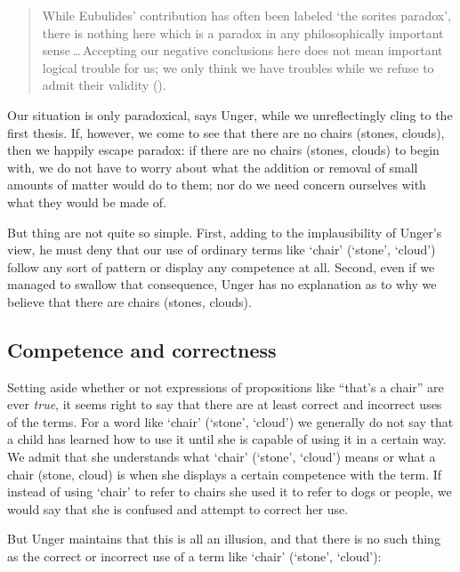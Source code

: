 \documentclass[11pt]{standalone} \newif\ifstandlone \standalonetrue
\newenvironment{squote}{%
	\begin{quote}\begin{singlespace}%
	}{%
	\end{singlespace}\end{quote}}
\begin{document}
\begin{spacing}{1.5}
\begin{enumerate}
\begin{squote}
While Eubulides' contribution has often been labeled `the sorites
paradox', there is nothing here which is a paradox in any
philosophically important sense\,\ldots\,Accepting our negative
conclusions here does not mean important logical trouble for us; we
only think we have troubles while we refuse to admit their validity
(\citeyear[145]{unger1979}).
\end{squote}

Our situation is only paradoxical, says Unger, while we unreflectingly
cling to the first thesis.  If, however, we come to see that there are
no chairs (stones, clouds), then we happily escape paradox: if there
are no chairs (stones, clouds) to begin with, we do not have to worry
about what the addition or removal of small amounts of matter would do
to them; nor do we need concern ourselves with what they would be made
of.

But thing are not quite so simple.  First, adding to the
implausibility of Unger's view, he must deny that our use of ordinary
terms like `chair' (`stone', `cloud') follow any sort of pattern or
display any competence at all.  Second, even if we managed to swallow
that consequence, Unger has no explanation as to why we believe that
there are chairs (stones, clouds).

\subsection{Competence and correctness}
Setting aside whether or not expressions of propositions like ``that's
a chair'' are ever \emph{true}, it seems right to say that there are at
least correct and incorrect uses of the terms.  For a word like
`chair' (`stone', `cloud') we generally do not say that a child has
learned how to use it until she is capable of using it in a certain
way.  We admit that she understands what `chair' (`stone', `cloud')
means or what a chair (stone, cloud) is when she displays a certain
competence with the term.  If instead of using `chair' to refer to
chairs she used it to refer to dogs or people, we would say that she
is confused and attempt to correct her use.

But Unger maintains that this is all an illusion, and that there is no
such thing as the correct or incorrect use of a term like `chair'
(`stone', `cloud'):


\end{enumerate}
\end{spacing}
\end{document}
